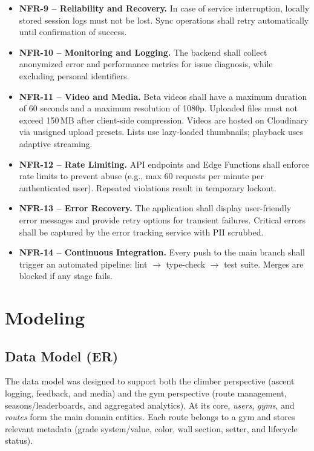 \documentclass[12pt,a4paper]{report}
\renewcommand\_{\textunderscore\hspace{0pt}}
\begin{document}
\begin{itemize}[leftmargin=1.2cm]
    \item \textbf{NFR-9 -- Reliability and Recovery.}
    In case of service interruption, locally stored session logs must not be lost. Sync operations shall retry automatically until confirmation of success.

    \item \textbf{NFR-10 -- Monitoring and Logging.}
    The backend shall collect anonymized error and performance metrics for issue diagnosis, while excluding personal identifiers.

    \item \textbf{NFR-11 -- Video and Media.}
    Beta videos shall have a maximum duration of 60 seconds and a maximum resolution of 1080p. Uploaded files must not exceed 150\,MB after client-side compression. Videos are hosted on Cloudinary via unsigned upload presets. Lists use lazy-loaded thumbnails; playback uses adaptive streaming.

    \item \textbf{NFR-12 -- Rate Limiting.}
    API endpoints and Edge Functions shall enforce rate limits to prevent abuse (e.g., max 60 requests per minute per authenticated user). Repeated violations result in temporary lockout.

    \item \textbf{NFR-13 -- Error Recovery.}
    The application shall display user-friendly error messages and provide retry options for transient failures. Critical errors shall be captured by the error tracking service with PII scrubbed.

    \item \textbf{NFR-14 -- Continuous Integration.}
    Every push to the main branch shall trigger an automated pipeline: lint $\rightarrow$ type-check $\rightarrow$ test suite. Merges are blocked if any stage fails.

\end{itemize}

\section{Modeling}

\subsection{Data Model (ER)}

The data model was designed to support both the climber perspective (ascent logging, feedback, and media) and the gym perspective (route management, seasons/leaderboards, and aggregated analytics). At its core, \textit{users}, \textit{gyms}, and \textit{routes} form the main domain entities. Each route belongs to a gym and stores relevant metadata (grade system/value, color, wall section, setter, and lifecycle status).
\end{document}

